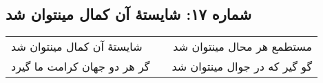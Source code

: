 \begin{center}
\section*{شماره ۱۷: شایستۀ آن کمال مینتوان شد}
\label{sec:017}
\begin{longtable}{l p{0.5cm} r}
شایستهٔ آن کمال مینتوان شد
&&
مستطمع هر محال مینتوان شد
\\
گر هر دو جهان کرامت ما گیرد
&&
گو گیر که در جوال مینتوان شد
\\
\end{longtable}
\end{center}
